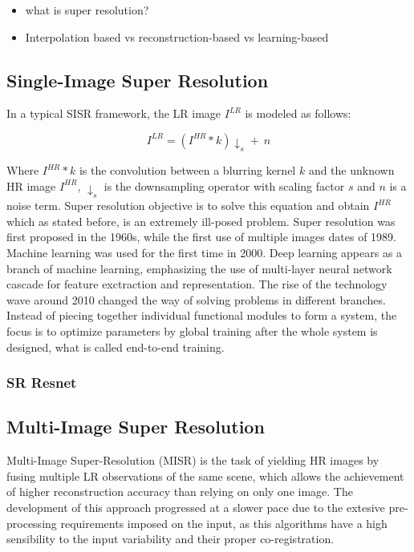     

\begin{itemize}
    \item what is super resolution?
    \item Interpolation based vs reconstruction-based vs learning-based
\end{itemize}

    \subsection{Single-Image Super Resolution}

        In a typical SISR framework, the LR image $I^{LR}$ is modeled as follows:
    
        \begin{equation}
            I^{LR} = ( I^{HR} \ast k) \downarrow_s + \ n
            \label{eq:2-degradation-equation}
        \end{equation}
    
        Where $I^{HR} \ast k$ is the convolution between a blurring kernel $k$ and the unknown  HR image  $I^{HR}$, $\downarrow_s$ is the downsampling operator with scaling factor $s$ and $n$ is a noise term. Super resolution objective is to solve this equation and obtain $I^{HR}$ which as stated before, is an extremely ill-posed problem. Super resolution was first proposed in the 1960s, while the first use of multiple images dates of 1989. Machine learning was used for the first time in 2000. Deep learning appears as a branch of machine learning, emphasizing the use of multi-layer neural network cascade for feature exctraction and representation. The rise of the technology wave around 2010 changed the way of solving problems in different branches. Instead of piecing together individual functional modules to form a system, the focus is to optimize parameters by global training after the whole system is designed, what is called end-to-end training. 
        \subsubsection{SR Resnet}
    \subsection{Multi-Image Super Resolution}

        Multi-Image Super-Resolution (MISR) is the task of yielding HR images by fusing multiple LR observations of the same scene, which allows the achievement of higher reconstruction accuracy than relying on only one image. The development of this approach progressed at a slower pace due to the extesive pre-processing requirements imposed on the input, as this algorithms have a high sensibility to the input variability and their proper co-registration.  

